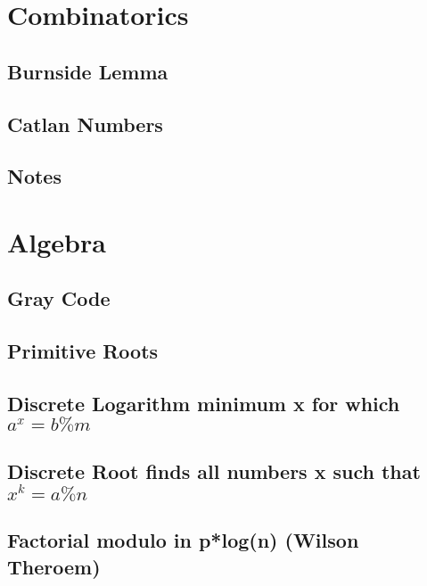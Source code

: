 \section{Combinatorics}
\subsection{Burnside Lemma}
\raggedbottom
\hrulefill
\subsection{Catlan Numbers}
\raggedbottom
\hrulefill
\subsection{Notes}
\raggedbottom
\hrulefill

\section{Algebra}
\subsection{Gray Code}
\raggedbottom
\hrulefill
\subsection{Primitive Roots}
\raggedbottom
\hrulefill
\subsection{Discrete Logarithm minimum x for which ${a^x = b \% m}$}
\raggedbottom
\hrulefill
\subsection{Discrete Root finds all numbers x such that ${x^k = a \% n}$}
\raggedbottom
\hrulefill
\subsection{Factorial modulo in p*log(n) (Wilson Theroem)}
\raggedbottom
\hrulefill
